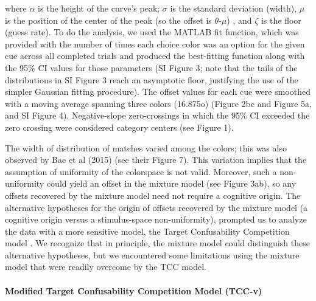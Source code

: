 \vspace{2em} 

where $\alpha$ is the height of the curve’s peak; $\sigma$ is the standard deviation (width), $\mu$ is the position of the center of the peak (so the offset is $\theta$-$\mu$)%
, and $\zeta$ is the floor (guess rate). 
To do the analysis, we used the MATLAB fit function, which was provided with the number of times each choice color was an option for the given cue across all completed trials and produced the best-fitting function along with the 95\% CI values for those parameters (SI Figure 3; note that the tails of the distributions in SI Figure 3 reach an asymptotic floor, justifying the use of the simpler Gaussian fitting procedure). %
The offset values for each cue were smoothed with a moving average spanning three colors (16.875o) (Figure 2bc and Figure 5a, and SI Figure 4). Negative-slope zero-crossings in which the 95\% CI exceeded the zero crossing were considered category centers (see Figure 1). %

The width of distribution of matches varied among the colors; this was also observed by Bae et al (2015) (see their Figure 7). 
This variation implies that the assumption of uniformity of the colorspace is not valid. 
Moreover, such a non-uniformity could yield an offset in the mixture model (see Figure 3ab), so any offsets recovered by the mixture model need not require a cognitive origin.  
The alternative hypotheses for the origin of offsets recovered by the mixture model (a cognitive origin versus a stimulus-space non-uniformity), prompted us to analyze the data with a more sensitive model, the Target Confusability Competition model \citep{schurgin_psychophysical_2020}.
We recognize that in principle, the mixture model could distinguish these alternative hypotheses, but we encountered some limitations using the mixture model that were readily overcome by the TCC model. 

\paragraph{Modified Target Confusability Competition Model (TCC-v)}\label{para:TCC}

